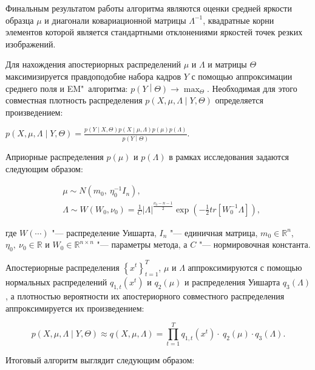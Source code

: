 Финальным результатом работы алгоритма являются оценки средней яркости образца $\mu$ и диагонали ковариационной матрицы $\Lambda^{-1}$, квадратные корни элементов которой является стандартными отклонениями яркостей точек резких изображений.

Для нахождения апостериорных распределений $\mu$ и $\Lambda$ и матрицы $\Theta$ максимизируется правдоподобие набора кадров $Y$ с помощью аппроксимации среднего поля и EM"~алгоритма: $p\left(Y\middle|\Theta\right) \rightarrow \max_{\Theta}$.
Необходимая для этого совместная плотность распределения $p\left(X,\mu,\Lambda\middle|Y,\Theta\right)$ определяется произведением:

$p\left(X,\mu,\Lambda\middle|Y,\Theta\right)=\frac{p\left(Y\middle|X,\Theta\right)p\left(X\middle|\mu,\Lambda\right)p\left(\mu\right)p\left(\Lambda\right)}{p\left(Y\middle|\Theta\right)}$.

Априорные распределения $p\left(\mu\right)$ и $p\left(\Lambda\right)$ в рамках исследования задаются следующим образом:

\begin{align*}
	&\mu \sim N\left(m_0,\ \eta_0^{-1}I_n\right), \\
	&\Lambda \sim W\left(W_0,\nu_0\right)=\frac{1}{C}\left|\Lambda\right|^\frac{\nu_0-n-1}{2}\exp{\left(-\frac{1}{2}tr\left[W_0^{-1}\Lambda\right]\right)},
\end{align*}

\noindent где $W(\cdots)$ "--- распределение Уишарта, $I_n$ "--- единичная матрица, $m_0\in\mathbb{R}^n$, $\eta_0,\ \nu_0\in\mathbb{R}$ и $W_0\in\mathbb{R}^{n \times n}$ "--- параметры метода, а $C$ "--- нормировочная константа.

Апостериорные распределения $\left\{x^t\right\}_{t=1}^T$, $\mu$ и $\Lambda$ аппроксимируются с помощью нормальных распределений $q_{1,t}\left(x^t\right)$ и $q_2\left(\mu\right)$ и распределения Уишарта $q_3\left(\Lambda\right)$, а плотностью вероятности их апостериорного совместного распределения аппроксимируется их произведением:

\begin{equation*}
	p\left(X,\mu,\Lambda\middle|Y,\Theta\right)\approx q\left(X,\mu,\Lambda\right)=\prod_{t=1}^{T}{q_{1,t}\left(x^t\right)\cdot\ q_2\left(\mu\right)\cdot q_3\left(\Lambda\right)}.
\end{equation*}

Итоговый алгоритм выглядит следующим образом:

